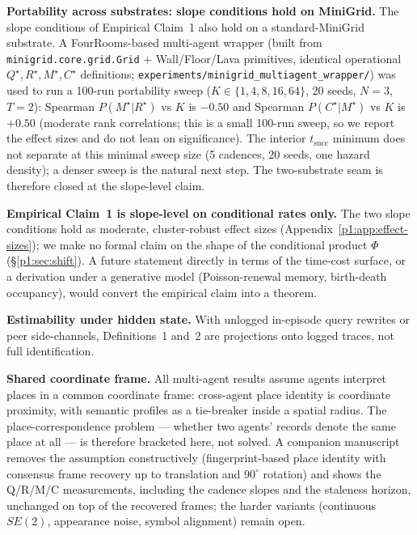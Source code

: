 \documentclass{article}
\begin{document}
\textbf{Portability across substrates: slope conditions hold on MiniGrid.} The slope conditions of Empirical Claim~1 also hold on a standard-MiniGrid substrate. A FourRooms-based multi-agent wrapper (built from \texttt{minigrid.core.grid.Grid} + Wall/Floor/Lava primitives, identical operational $Q^\star,R^\star,M^\star,C^\star$ definitions; \texttt{experiments/minigrid\_multiagent\_wrapper/}) was used to run a 100-run portability sweep ($K{\in}\{1,4,8,16,64\}$, 20 seeds, $N{=}3$, $T{=}2$): Spearman $P(M^\star|R^\star)$ vs $K$ is $-0.50$ and Spearman $P(C^\star|M^\star)$ vs $K$ is $+0.50$ (moderate rank correlations; this is a small 100-run sweep, so we report the effect sizes and do not lean on significance). The interior $t_{\mathrm{succ}}$ minimum does not separate at this minimal sweep size (5 cadences, 20 seeds, one hazard density); a denser sweep is the natural next step. The two-substrate seam is therefore closed at the slope-level claim.

\textbf{Empirical Claim~1 is slope-level on conditional rates only.} The two slope conditions hold as moderate, cluster-robust effect sizes (Appendix~\ref{p1:app:effect-sizes}); we make no formal claim on the shape of the conditional product $\Phi$ (\S\ref{p1:sec:shift}). A future statement directly in terms of the time-cost surface, or a derivation under a generative model (Poisson-renewal memory, birth-death occupancy), would convert the empirical claim into a theorem.

\textbf{Estimability under hidden state.} With unlogged in-episode query rewrites or peer side-channels, Definitions~1 and~2 are projections onto logged traces, not full identification.

\textbf{Shared coordinate frame.} All multi-agent results assume agents
interpret places in a common coordinate frame: cross-agent place
identity is coordinate proximity, with semantic profiles as a
tie-breaker inside a spatial radius. The place-correspondence problem
--- whether two agents' records denote the same place at all --- is
therefore bracketed here, not solved. A companion manuscript removes
the assumption constructively (fingerprint-based place identity with
consensus frame recovery up to translation and $90^\circ$ rotation)
and shows the Q/R/M/C measurements, including the cadence slopes and
the staleness horizon, unchanged on top of the recovered frames; the
harder variants (continuous $SE(2)$, appearance noise, symbol
alignment) remain open.
\end{document}
